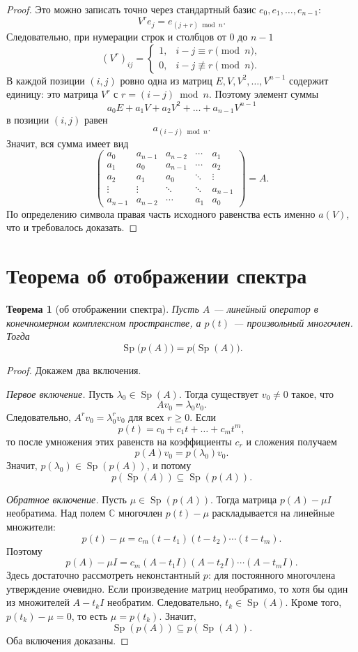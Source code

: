 \documentclass[12pt,a4paper]{article}
\newtheorem{theorem}{Теорема}
\theoremstyle{definition}
\theoremstyle{remark}
\DeclareMathOperator{\Sp}{Sp}
\newcommand{\CC}{\mathbb{C}}
\begin{document}
\begin{proof}
Это можно записать точно через стандартный базис
$e_0,e_1,\dots,e_{n-1}$:
\[
  V^re_j=e_{(j+r)\bmod n}.
\]
Следовательно, при нумерации строк и столбцов от $0$ до $n-1$
\[
  (V^r)_{ij}=
  \begin{cases}
    1, & i-j\equiv r\pmod n,\\
    0, & i-j\not\equiv r\pmod n.
  \end{cases}
\]
В каждой позиции $(i,j)$ ровно одна из матриц
$E,V,V^2,\dots,V^{n-1}$ содержит единицу: это матрица $V^r$ с
$r=(i-j)\bmod n$. Поэтому элемент суммы
\[
  a_0E+a_1V+a_2V^2+\dots+a_{n-1}V^{n-1}
\]
в позиции $(i,j)$ равен
\[
  a_{(i-j)\bmod n}.
\]
Значит, вся сумма имеет вид
\[
  \begin{pmatrix}
    a_0     & a_{n-1} & a_{n-2} & \cdots & a_1\\
    a_1     & a_0     & a_{n-1} & \cdots & a_2\\
    a_2     & a_1     & a_0     & \ddots & \vdots\\
    \vdots  & \vdots  & \ddots  & \ddots & a_{n-1}\\
    a_{n-1} & a_{n-2} & \cdots  & a_1    & a_0
  \end{pmatrix}=A.
\]
По определению символа правая часть исходного равенства есть именно
$a(V)$, что и требовалось доказать.
\end{proof}

\section{Теорема об отображении спектра}

\begin{theorem}[об отображении спектра]
Пусть $A$ --- линейный оператор в конечномерном комплексном пространстве,
а $p(t)$ --- произвольный многочлен. Тогда
\[
  \Sp\bigl(p(A)\bigr)=p\bigl(\Sp(A)\bigr).
\]
\end{theorem}

\begin{proof}
Докажем два включения.

\smallskip
\noindent
\emph{Первое включение.}
Пусть $\lambda_0\in\Sp(A)$. Тогда существует $v_0\ne0$ такое, что
\[
  Av_0=\lambda_0v_0.
\]
Следовательно, $A^rv_0=\lambda_0^rv_0$ для всех $r\geqslant0$. Если
\[
  p(t)=c_0+c_1t+\dots+c_mt^m,
\]
то после умножения этих равенств на коэффициенты $c_r$ и сложения получаем
\[
  p(A)v_0=p(\lambda_0)v_0.
\]
Значит, $p(\lambda_0)\in\Sp(p(A))$, и потому
\[
  p(\Sp(A))\subseteq\Sp(p(A)).
\]

\smallskip
\noindent
\emph{Обратное включение.}
Пусть $\mu\in\Sp(p(A))$. Тогда матрица $p(A)-\mu I$ необратима. Над полем
$\CC$ многочлен $p(t)-\mu$ раскладывается на линейные множители:
\[
  p(t)-\mu=c_m(t-t_1)(t-t_2)\cdots(t-t_m).
\]
Поэтому
\[
  p(A)-\mu I
  =c_m(A-t_1I)(A-t_2I)\cdots(A-t_mI).
\]
Здесь достаточно рассмотреть неконстантный $p$: для постоянного многочлена
утверждение очевидно.
Если произведение матриц необратимо, то хотя бы один из множителей
$A-t_kI$ необратим. Следовательно, $t_k\in\Sp(A)$. Кроме того,
$p(t_k)-\mu=0$, то есть $\mu=p(t_k)$. Значит,
\[
  \Sp(p(A))\subseteq p(\Sp(A)).
\]
Оба включения доказаны.
\end{proof}
\end{document}
